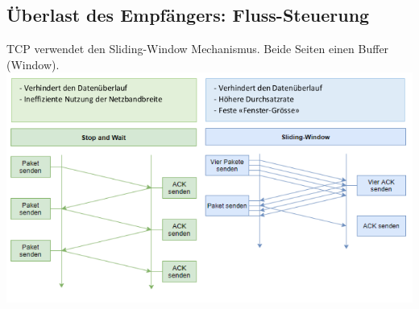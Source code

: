 {    




}




\subsection{Überlast des Empfängers: Fluss-Steuerung}
{TCP verwendet den Sliding-Window Mechanismus. Beide Seiten einen Buffer (Window).}
\includegraphics[scale=.375]{img/ueberlast.png}
